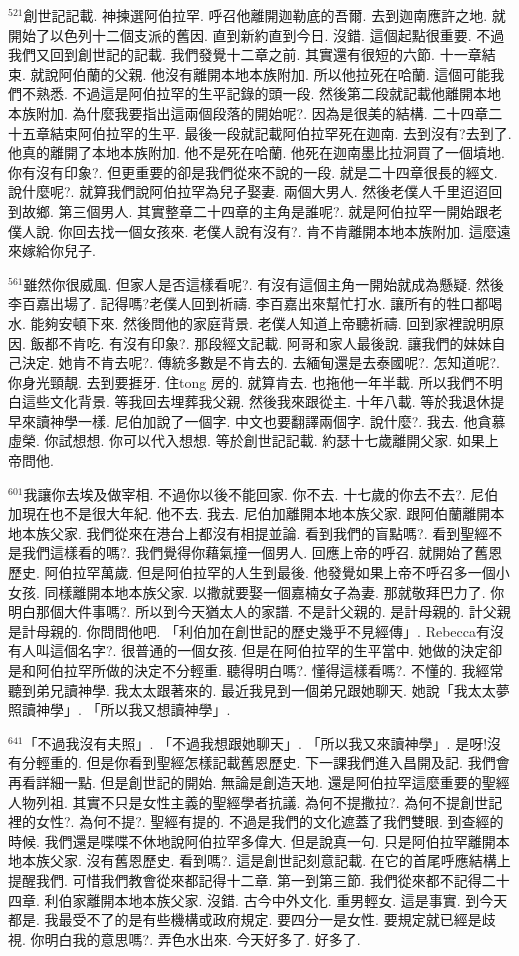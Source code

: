 \documentclass{book}
\begin{document}
$^{521}$創世記記載.
神揀選阿伯拉罕.
呼召他離開迦勒底的吾爾.
去到迦南應許之地.
就開始了以色列十二個支派的舊因.
直到新約直到今日.
沒錯.
這個起點很重要.
不過我們又回到創世記的記載.
我們發覺十二章之前.
其實還有很短的六節.
十一章結束.
就說阿伯蘭的父親.
他沒有離開本地本族附加.
所以他拉死在哈蘭.
這個可能我們不熟悉.
不過這是阿伯拉罕的生平記錄的頭一段.
然後第二段就記載他離開本地本族附加.
為什麼我要指出這兩個段落的開始呢?.
因為是很美的結構.
二十四章二十五章結束阿伯拉罕的生平.
最後一段就記載阿伯拉罕死在迦南.
去到沒有?去到了.
他真的離開了本地本族附加.
他不是死在哈蘭.
他死在迦南墨比拉洞買了一個墳地.
你有沒有印象?.
但更重要的卻是我們從來不說的一段.
就是二十四章很長的經文.
說什麼呢?.
就算我們說阿伯拉罕為兒子娶妻.
兩個大男人.
然後老僕人千里迢迢回到故鄉.
第三個男人.
其實整章二十四章的主角是誰呢?.
就是阿伯拉罕一開始跟老僕人說.
你回去找一個女孩來.
老僕人說有沒有?.
肯不肯離開本地本族附加.
這麼遠來嫁給你兒子.

$^{561}$雖然你很威風.
但家人是否這樣看呢?.
有沒有這個主角一開始就成為懸疑.
然後李百嘉出場了.
記得嗎?老僕人回到祈禱.
李百嘉出來幫忙打水.
讓所有的牲口都喝水.
能夠安頓下來.
然後問他的家庭背景.
老僕人知道上帝聽祈禱.
回到家裡說明原因.
飯都不肯吃.
有沒有印象?.
那段經文記載.
阿哥和家人最後說.
讓我們的妹妹自己決定.
她肯不肯去呢?.
傳統多數是不肯去的.
去緬甸還是去泰國呢?.
怎知道呢?.
你身光頸靚.
去到要捱牙.
住tong 房的.
就算肯去.
也拖他一年半載.
所以我們不明白這些文化背景.
等我回去埋葬我父親.
然後我來跟從主.
十年八載.
等於我退休提早來讀神學一樣.
尼伯加說了一個字.
中文也要翻譯兩個字.
說什麼?.
我去.
他貪慕虛榮.
你試想想.
你可以代入想想.
等於創世記記載.
約瑟十七歲離開父家.
如果上帝問他.

$^{601}$我讓你去埃及做宰相.
不過你以後不能回家.
你不去.
十七歲的你去不去?.
尼伯加現在也不是很大年紀.
他不去.
我去.
尼伯加離開本地本族父家.
跟阿伯蘭離開本地本族父家.
我們從來在港台上都沒有相提並論.
看到我們的盲點嗎?.
看到聖經不是我們這樣看的嗎?.
我們覺得你藉氣撞一個男人.
回應上帝的呼召.
就開始了舊恩歷史.
阿伯拉罕萬歲.
但是阿伯拉罕的人生到最後.
他發覺如果上帝不呼召多一個小女孩.
同樣離開本地本族父家.
以撒就要娶一個嘉楠女子為妻.
那就敬拜巴力了.
你明白那個大件事嗎?.
所以到今天猶太人的家譜.
不是計父親的.
是計母親的.
計父親是計母親的.
你問問他吧.
「利伯加在創世記的歷史幾乎不見經傳」.
Rebecca有沒有人叫這個名字?.
很普通的一個女孩.
但是在阿伯拉罕的生平當中.
她做的決定卻是和阿伯拉罕所做的決定不分輕重.
聽得明白嗎?.
懂得這樣看嗎?.
不懂的.
我經常聽到弟兄讀神學.
我太太跟著來的.
最近我見到一個弟兄跟她聊天.
她說「我太太夢照讀神學」.
「所以我又想讀神學」.

$^{641}$「不過我沒有夫照」.
「不過我想跟她聊天」.
「所以我又來讀神學」.
是呀!沒有分輕重的.
但是你看到聖經怎樣記載舊恩歷史.
下一課我們進入昌開及記.
我們會再看詳細一點.
但是創世記的開始.
無論是創造天地.
還是阿伯拉罕這麼重要的聖經人物列祖.
其實不只是女性主義的聖經學者抗議.
為何不提撒拉?.
為何不提創世記裡的女性?.
為何不提?.
聖經有提的.
不過是我們的文化遮蓋了我們雙眼.
到查經的時候.
我們還是喋喋不休地說阿伯拉罕多偉大.
但是說真一句.
只是阿伯拉罕離開本地本族父家.
沒有舊恩歷史.
看到嗎?.
這是創世記刻意記載.
在它的首尾呼應結構上提醒我們.
可惜我們教會從來都記得十二章.
第一到第三節.
我們從來都不記得二十四章.
利伯家離開本地本族父家.
沒錯.
古今中外文化.
重男輕女.
這是事實.
到今天都是.
我最受不了的是有些機構或政府規定.
要四分一是女性.
要規定就已經是歧視.
你明白我的意思嗎?.
弄色水出來.
今天好多了.
好多了.
\end{document}
